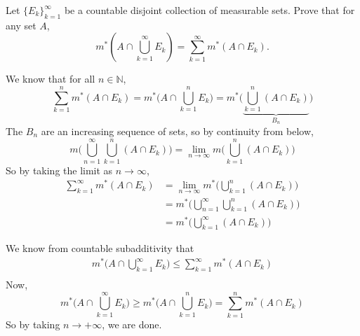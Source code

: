   \begin{exercise}[Royden 2.26][ex:royden2.26]
    Let $\{E_k\}_{k=1}^{\infty}$ be a countable disjoint collection of measurable sets. Prove that for any set $A$,
    \begin{equation*}
      m^{\ast}\left(A \cap \bigcup_{k=1}^{\infty} E_k\right) = \sum_{k=1}^{\infty} m^{\ast}(A \cap E_k).
    \end{equation*}
  \end{exercise}
  \begin{solution}
    We know that for all $n \in \mathbb{N}$, 
    \begin{equation}
      \sum_{k=1}^n m^\ast (A \cap E_k) = m^\ast \bigg( A \cap \bigcup_{k=1}^n E_k \bigg) = m^\ast \bigg( \underbrace{\bigcup_{k=1}^n (A \cap E_k)}_{B_n} \bigg)
    \end{equation}
    The $B_n$ are an increasing sequence of sets, so by continuity from below, 
    \begin{equation}
      m \bigg( \bigcup_{n=1}^\infty \bigcup_{k=1}^n (A \cap E_k) \bigg) = \lim_{n \to \infty} m \bigg( \bigcup_{k=1}^n (A \cap E_k) \bigg)
    \end{equation}
    So by taking the limit as $n \to \infty$, 
    \begin{align}
      \sum_{k=1}^\infty m^\ast (A \cap E_k) & = \lim_{n \to \infty} m^\ast \bigg( \bigcup_{k=1}^n (A \cap E_k) \bigg) \\ 
                                            & = m^\ast \bigg( \bigcup_{n=1}^\infty \bigcup_{k=1}^n (A \cap E_k) \bigg) \\ 
                                            & = m^\ast \bigg( \bigcup_{k=1}^\infty (A \cap E_k) \bigg) 
    \end{align}
  \end{solution}
  \begin{solution}
    We know from countable subadditivity that 
    \begin{align}
      m^\ast \bigg( A \cap \bigcup_{k=1}^\infty E_k \bigg) \leq \sum_{k=1}^\infty m^\ast (A \cap E_k) \\ 
    \end{align}
    Now, 
    \begin{equation}
      m^\ast \bigg( A \cap \bigcup_{k=1}^\infty E_k \bigg) \geq m^\ast \bigg( A \cap \bigcup_{k=1}^n E_k \bigg) = \sum_{k=1}^n m^\ast (A \cap E_k)
    \end{equation}
    So by taking $n \to +\infty$, we are done. 
  \end{solution}

